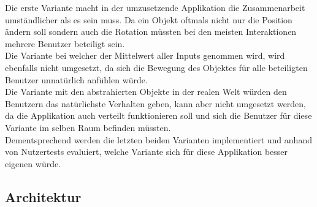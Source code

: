 \bigskip
Die erste Variante macht in der umzusetzende Applikation die Zusammenarbeit umständlicher als es sein muss. Da ein Objekt oftmals nicht nur die Position ändern soll sondern auch die Rotation müssten bei den meisten Interaktionen mehrere Benutzer beteiligt sein. \\
Die Variante bei welcher der Mittelwert aller Inputs genommen wird, wird ebenfalls nicht umgesetzt, da sich die Bewegung des Objektes für alle beteiligten Benutzer unnatürlich anfühlen würde. \\
Die Variante mit den abstrahierten Objekte in der realen Welt würden den Benutzern das natürlichste Verhalten geben, kann aber nicht umgesetzt werden, da die Applikation auch verteilt funktionieren soll und sich die Benutzer für diese Variante im selben Raum befinden müssten. \\
Dementsprechend werden die letzten beiden Varianten implementiert und anhand von Nutzertests evaluiert, welche Variante sich für diese Applikation besser eigenen würde.

\subsection{Architektur}